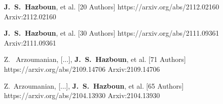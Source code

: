         {\textbf{J.~S.~{Hazboun}}, et al. [20 Authors]}
         {https://arxiv.org/abs/2112.02160}
         {{Arxiv:}2112.02160}

         {\textbf{J.~S.~{Hazboun}}, et al. [30 Authors]}
         {https://arxiv.org/abs/2111.09361}
         {{Arxiv:}2111.09361}

         {Z. ~{Arzoumanian}, [...], \textbf{J.~S.~{Hazboun}}, et al. [71 Authors]}
         {https://arxiv.org/abs/2109.14706}
         {{Arxiv:}2109.14706}

         {Z.~{Arzoumanian}, [...], \textbf{J.~S.~{Hazboun}}, et al. [65 Authors]}
         {https://arxiv.org/abs/2104.13930}
         {{Arxiv:}2104.13930}

